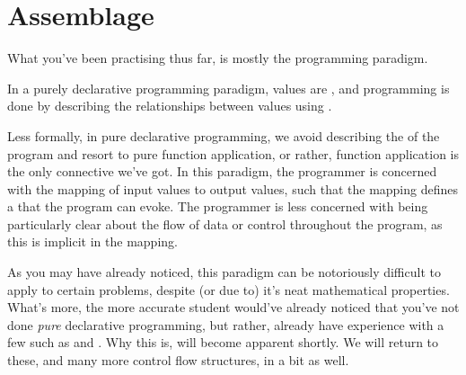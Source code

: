 \chapter{Assemblage}

%

%
%
%
%
%





\vspace{0.5in}

What you've been practising thus far, is mostly the 
programming paradigm.

\begin{definition}

In a purely declarative programming paradigm, values are , and
programming is done by describing the relationships between values using
.

\end{definition}

Less formally, in pure declarative programming, we avoid describing the
 of the program and resort to pure function application, or rather,
function application is the only connective we've got.  In this paradigm, the
programmer is concerned with the mapping of input values to output values, such
that the mapping defines a  that the program can
evoke.  The programmer is less concerned with being particularly clear about
the flow of data or control throughout the program, as this is implicit in the
mapping.

As you may have already noticed, this paradigm can be notoriously difficult to
apply to certain problems, despite (or due to) it's neat mathematical
properties.  What's more, the more accurate student would've already noticed
that you've not done \emph{pure} declarative programming, but rather, already
have experience with a few  such as  and
 .  Why this is, will become
apparent shortly. We will return to these, and many more control flow
structures, in a bit as well.

